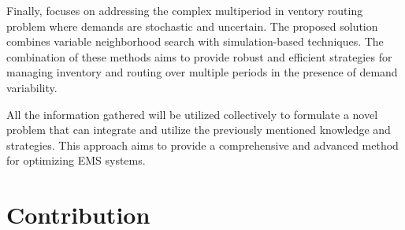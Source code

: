 Finally, \citet{gruler2020variable} focuses on addressing the complex multiperiod in \-ven\-to\-ry routing problem where demands are stochastic and uncertain. The proposed solution combines variable neighborhood search with simulation-based techniques. The combination of these methods aims to provide robust and efficient strategies for managing inventory and routing over multiple periods in the presence of demand variability.

All the information gathered will be utilized collectively to formulate a novel problem that can integrate and utilize the previously mentioned knowledge and strategies. This approach aims to provide a comprehensive and advanced method for optimizing EMS systems.






\section{Contribution}


